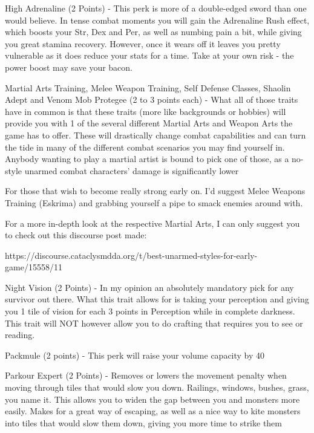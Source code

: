 \documentclass[11pt]{report}
\begin{document}
High Adrenaline (2 Points) - This perk is more of a double-edged sword than one would believe. In tense combat moments you will gain the Adrenaline Rush effect, which boosts your Str, Dex and Per, as well as numbing pain a bit, while giving you great stamina recovery. However, once it wears off it leaves you pretty vulnerable as it does reduce your stats for a time. Take at your own risk - the power boost may save your bacon.

Martial Arts Training, Melee Weapon Training, Self Defense Classes, Shaolin Adept and Venom Mob Protegee (2 to 3 points each) - What all of those traits have in common is that these traits (more like backgrounds or hobbies) will provide you with 1 of the several different Martial Arts and Weapon Arts the game has to offer. These will drastically change combat capabilities and can turn the tide in many of the different combat scenarios you may find yourself in. Anybody wanting to play a martial artist is bound to pick one of those, as a no-style unarmed combat characters' damage is significantly lower

For those that wish to become really strong early on. I'd suggest Melee Weapons Training (Eskrima) and grabbing yourself a pipe to smack enemies around with.

For a more in-depth look at the respective Martial Arts, I can only suggest you to check out this discourse post made:

https://discourse.cataclysmdda.org/t/best-unarmed-styles-for-early-game/15558/11

Night Vision (2 Points) - In my opinion an absolutely mandatory pick for any survivor out there. What this trait allows for is taking your perception and giving you 1 tile of vision for each 3 points in Perception while in complete darkness. This trait will NOT however allow you to do crafting that requires you to see or reading.

Packmule (2 points) - This perk will raise your volume capacity by 40%

Parkour Expert (2 Points) - Removes or lowers the movement penalty when moving through tiles that would slow you down. Railings, windows, bushes, grass, you name it. This allows you to widen the gap between you and monsters more easily. Makes for a great way of escaping, as well as a nice way to kite monsters into tiles that would slow them down, giving you more time to strike them
\end{document}
